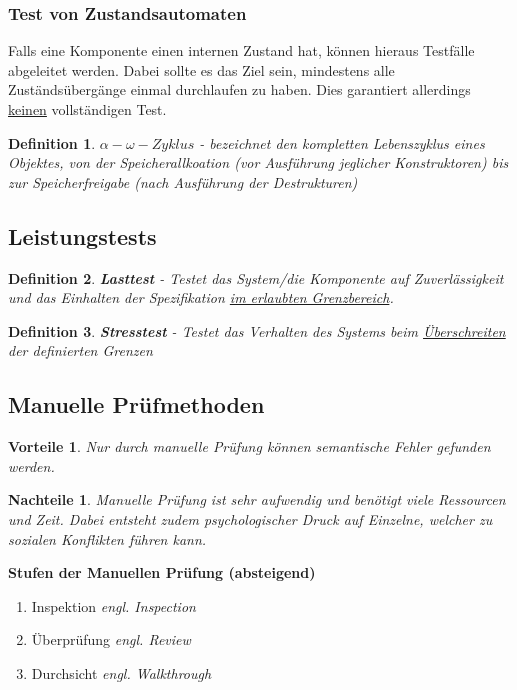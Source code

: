 \documentclass[a4paper]{article}
\theoremstyle{break}
\newtheorem{defi}{Definition}[section]
\newtheorem{why}{Vorteile}[section]
\newtheorem{whynot}{Nachteile}[section]
\begin{document}
        \subsubsection{Test von Zustandsautomaten}
        Falls eine Komponente einen internen Zustand hat, k\"onnen hieraus Testf\"alle abgeleitet werden. Dabei sollte es das Ziel sein, mindestens alle Zust\"ands\"uberg\"ange einmal durchlaufen zu haben. Dies garantiert allerdings \ul{keinen} vollst\"andigen Test.

        \begin{defi}
          \textbf{\(\alpha - \omega -Zyklus \)} - bezeichnet den kompletten Lebenszyklus eines Objektes, von der Speicherallkoation (vor Ausf\"uhrung jeglicher Konstruktoren) bis zur Speicherfreigabe (nach Ausf\"uhrung der Destrukturen)
        \end{defi}
        
        
        \subsection{Leistungstests}
        \begin{defi}
          \textbf{Lasttest} - Testet das System/die Komponente auf Zuverl\"assigkeit und das Einhalten der Spezifikation \ul{im erlaubten Grenzbereich}.
        \end{defi}

        \begin{defi}
          \textbf{Stresstest} - Testet das Verhalten des Systems beim \ul{\"Uberschreiten} der definierten Grenzen
        \end{defi}
        
        
        \subsection{Manuelle Prüfmethoden}
        \begin{why}
        Nur durch manuelle Pr\"ufung k\"onnen semantische Fehler gefunden werden. 
        \end{why}
        \begin{whynot}
          Manuelle Pr\"ufung ist sehr aufwendig und ben\"otigt viele Ressourcen und Zeit.
          Dabei entsteht zudem psychologischer Druck auf Einzelne, welcher zu sozialen Konflikten f\"uhren kann.
        \end{whynot}
        
          \textbf{Stufen der Manuellen Pr\"ufung (absteigend)}
          \begin{enumerate}
          \item Inspektion \textit{engl. Inspection}
          \item \"Uberpr\"ufung \textit{engl. Review}
          \item Durchsicht \textit{engl. Walkthrough}
          \end{enumerate}
        
\end{document}
